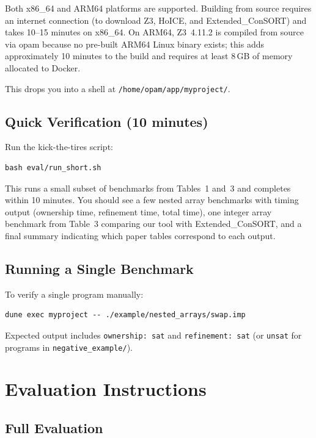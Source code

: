 \documentclass[a4paper,USenglish]{darts-v2021}
\begin{document}
Both x86\_64 and ARM64 platforms are supported.
Building from source requires an internet connection (to download Z3, HoICE, and
Extended\_ConSORT) and takes 10--15 minutes on x86\_64.
On ARM64, Z3~4.11.2 is compiled from source via opam because no pre-built ARM64
Linux binary exists; this adds approximately 10 minutes to the build and
requires at least 8\,GB of memory allocated to Docker.

This drops you into a shell at \texttt{/home/opam/app/myproject/}.

\subsection{Quick Verification (10 minutes)}

Run the kick-the-tires script:

\begin{verbatim}
bash eval/run_short.sh
\end{verbatim}

This runs a small subset of benchmarks from Tables~1 and~3 and completes within
10 minutes. You should see a few nested array benchmarks with timing output
(ownership time, refinement time, total time), one integer array benchmark
from Table~3 comparing our tool with Extended\_ConSORT, and a final summary
indicating which paper tables correspond to each output.

\subsection{Running a Single Benchmark}

To verify a single program manually:

\begin{verbatim}
dune exec myproject -- ./example/nested_arrays/swap.imp
\end{verbatim}

Expected output includes \texttt{ownership: sat} and \texttt{refinement: sat}
(or \texttt{unsat} for programs in \texttt{negative\_example/}).


\section{Evaluation Instructions}

\subsection{Full Evaluation}
\end{document}
